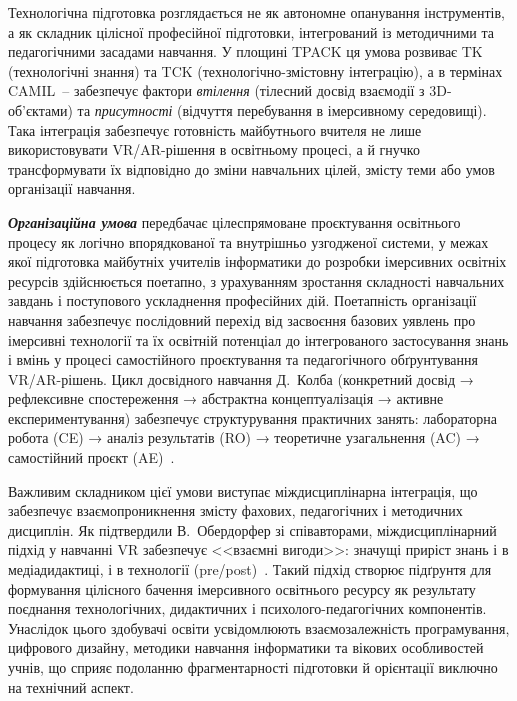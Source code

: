Технологічна підготовка розглядається не як автономне опанування інструментів, а як складник цілісної професійної підготовки, інтегрований із методичними та педагогічними засадами навчання. У площині TPACK ця умова розвиває TK (технологічні знання) та TCK (технологічно-змістовну інтеграцію), а в термінах CAMIL~-- забезпечує фактори \emph{втілення} (тілесний досвід взаємодії з 3D-об'єктами) та \emph{присутності} (відчуття перебування в імерсивному середовищі). Така інтеграція забезпечує готовність майбутнього вчителя не лише використовувати VR/AR-рішення в освітньому процесі, а й гнучко трансформувати їх відповідно до зміни навчальних цілей, змісту теми або умов організації навчання.

\emph{\textbf{Організаційна умова}} передбачає цілеспрямоване проєктування освітнього процесу як логічно впорядкованої та внутрішньо узгодженої системи, у межах якої підготовка майбутніх учителів інформатики до розробки імерсивних освітніх ресурсів здійснюється поетапно, з урахуванням зростання складності навчальних завдань і поступового ускладнення професійних дій. Поетапність організації навчання забезпечує послідовний перехід від засвоєння базових уявлень про імерсивні технології та їх освітній потенціал до інтегрованого застосування знань і вмінь у процесі самостійного проєктування та педагогічного обґрунтування VR/AR-рішень. Цикл досвідного навчання Д.~Колба (конкретний досвід → рефлексивне спостереження → абстрактна концептуалізація → активне експериментування) забезпечує структурування практичних занять: лабораторна робота (CE) → аналіз результатів (RO) → теоретичне узагальнення (AC) → самостійний проєкт (AE)~\cite{Kee2023Experiential}.

Важливим складником цієї умови виступає міждисциплінарна інтеграція, що забезпечує взаємопроникнення змісту фахових, педагогічних і методичних дисциплін. Як підтвердили В.~Обердорфер зі співавторами, міждисциплінарний підхід у навчанні VR забезпечує <<взаємні вигоди>>: значущі приріст знань і в медіадидактиці, і в технології (pre/post)~\cite{Oberdorfer2021Interdisciplinary}. Такий підхід створює підґрунтя для формування цілісного бачення імерсивного освітнього ресурсу як результату поєднання технологічних, дидактичних і психолого-педагогічних компонентів. Унаслідок цього здобувачі освіти усвідомлюють взаємозалежність програмування, цифрового дизайну, методики навчання інформатики та вікових особливостей учнів, що сприяє подоланню фрагментарності підготовки й орієнтації виключно на технічний аспект.

